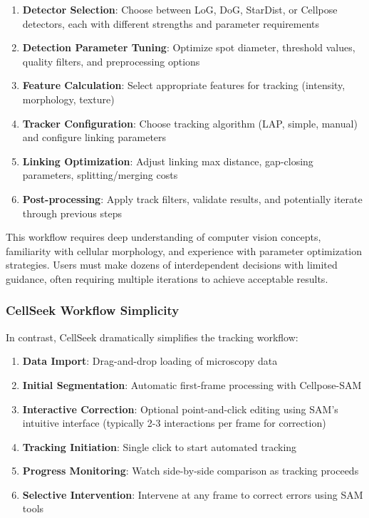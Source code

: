 \documentclass[../cellseek_paper.tex]{subfiles}
\begin{document}
\begin{enumerate}
  \item \textbf{Detector Selection}: Choose between LoG, DoG, StarDist, or Cellpose detectors, each with different strengths and parameter requirements
  \item \textbf{Detection Parameter Tuning}: Optimize spot diameter, threshold values, quality filters, and preprocessing options
  \item \textbf{Feature Calculation}: Select appropriate features for tracking (intensity, morphology, texture)
  \item \textbf{Tracker Configuration}: Choose tracking algorithm (LAP, simple, manual) and configure linking parameters
  \item \textbf{Linking Optimization}: Adjust linking max distance, gap-closing parameters, splitting/merging costs
  \item \textbf{Post-processing}: Apply track filters, validate results, and potentially iterate through previous steps
\end{enumerate}

This workflow requires deep understanding of computer vision concepts, familiarity with cellular morphology, and experience with parameter optimization strategies. Users must make dozens of interdependent decisions with limited guidance, often requiring multiple iterations to achieve acceptable results.

\subsubsection{CellSeek Workflow Simplicity}

In contrast, CellSeek dramatically simplifies the tracking workflow:

\begin{enumerate}
  \item \textbf{Data Import}: Drag-and-drop loading of microscopy data
  \item \textbf{Initial Segmentation}: Automatic first-frame processing with Cellpose-SAM
  \item \textbf{Interactive Correction}: Optional point-and-click editing using SAM's intuitive interface (typically 2-3 interactions per frame for correction)
  \item \textbf{Tracking Initiation}: Single click to start automated tracking
  \item \textbf{Progress Monitoring}: Watch side-by-side comparison as tracking proceeds
  \item \textbf{Selective Intervention}: Intervene at any frame to correct errors using SAM tools
\end{enumerate}
\end{document}
